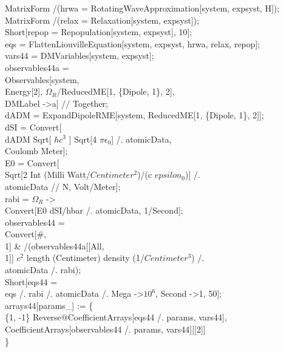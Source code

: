 MatrixForm /\@ (hrwa = RotatingWaveApproximation[system, expsyst, H]);\\
MatrixForm /\@ (relax = Relaxation[system, expsyst]);\\
Short[repop = Repopulation[system, expsyst], 10];\\

eqs = Flatten\@ LiouvilleEquation[system, expsyst, hrwa, relax, repop];\\

vars44 = DMVariables[system, expsyst];\\

observables44a = \\
  Observables[system, \\
    Energy[2], $\Omega_R$/ReducedME[1, \{Dipole, 1\}, 2], \\
    DMLabel -\textgreater a] // Together;\\
dADM = ExpandDipoleRME[system, ReducedME[1, \{Dipole, 1\}, 2]];\\
dSI = Convert[\\
   dADM Sqrt[ $ hc^3$ ] Sqrt[4 $\pi\epsilon_0$] /. atomicData, \\
   Coulomb Meter];\\
E0 = Convert[\\
   Sqrt[2 Int (Milli Watt/$Centimeter^2$)/(c $epsilon_0$)] /. \\
     atomicData // N, Volt/Meter];\\
rabi = $\Omega_R$ -\textgreater \\
   Convert[E0 dSI/hbar /. atomicData, 1/Second];\\
observables44 = \\
  Convert[\#, \\
     1] \& /\@ (observables44a[[All, \\
        1]] $c^2$ length (Centimeter) density (1/$Centimeter^3$) /. \\
      atomicData /. rabi);\\
Short[eqs44 = \\
   eqs /. rabi /. atomicData /. {Mega -\textgreater $10^{6}$, Second -\textgreater 1}, 50];\\
arrays44[params\_] := \{\\
  \{1, -1\} Reverse@CoefficientArrays[eqs44 /. params, vars44], \\
  CoefficientArrays[observables44 /. params, vars44][[2]]\\
  \}\\



